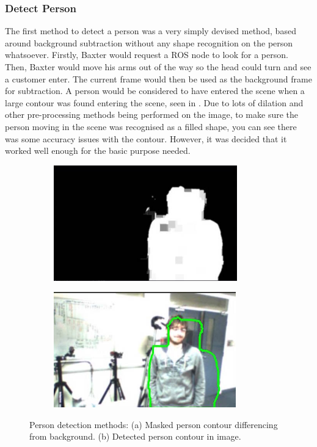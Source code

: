 \subsubsection{Detect Person}
The first method to detect a person was a very simply devised method, based around background subtraction without any shape recognition on the person whatsoever. Firstly, Baxter would request a ROS node to look for a person. Then, Baxter would move his arms out of the way so the head could turn and see a customer enter. The current frame would then be used as the background frame for subtraction. A person would be considered to have entered the scene when a large contour was found entering the scene, seen in \textbf{}. Due to lots of dilation and other pre-processing methods being performed on the image, to make sure the person moving in the scene was recognised as a filled shape, you can see there was some accuracy issues with the contour. However, it was decided that it worked well enough for the basic purpose needed.
\begin{figure}[H]
    \captionsetup[subfigure]{justification=centering}
    \begin{subfigure}[H!]{0.475\textwidth}   
        \centering 
        \caption{}
        \includegraphics[width=\textwidth, height=5cm]{personprocessing.jpeg}
        \label{fig:TimeGrasp}
    \end{subfigure}
    \begin{subfigure}[H]{0.475\textwidth}   
        \centering 
        \caption{}
        \includegraphics[width=\textwidth, height=5cm]{personrecognised.jpeg}
        \label{fig:personcontour}
    \end{subfigure}
    \vspace{-0.5cm}
    \caption{Person detection methods: (a) Masked person contour differencing from background. (b) Detected person contour in image.}
\end{figure}
